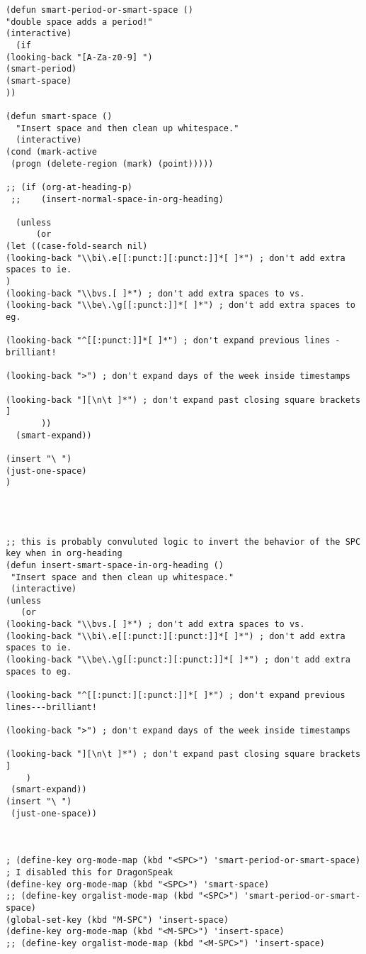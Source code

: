 \documentclass[11pt]{article}
\begin{document}
\begin{verbatim}
(defun smart-period-or-smart-space ()
"double space adds a period!"
(interactive)
  (if
(looking-back "[A-Za-z0-9] ")
(smart-period)
(smart-space)
))

(defun smart-space ()
  "Insert space and then clean up whitespace."
  (interactive)
(cond (mark-active
 (progn (delete-region (mark) (point)))))

;; (if (org-at-heading-p)
 ;;    (insert-normal-space-in-org-heading)

  (unless
      (or
(let ((case-fold-search nil)
(looking-back "\\bi\.e[[:punct:][:punct:]]*[ ]*") ; don't add extra spaces to ie.
)
(looking-back "\\bvs.[ ]*") ; don't add extra spaces to vs.
(looking-back "\\be\.\g[[:punct:]]*[ ]*") ; don't add extra spaces to eg.

(looking-back "^[[:punct:]]*[ ]*") ; don't expand previous lines - brilliant!

(looking-back ">") ; don't expand days of the week inside timestamps

(looking-back "][\n\t ]*") ; don't expand past closing square brackets ]
       ))
  (smart-expand))

(insert "\ ")
(just-one-space)
)




;; this is probably convuluted logic to invert the behavior of the SPC key when in org-heading
(defun insert-smart-space-in-org-heading ()
 "Insert space and then clean up whitespace."
 (interactive)
(unless
   (or
(looking-back "\\bvs.[ ]*") ; don't add extra spaces to vs.
(looking-back "\\bi\.e[[:punct:][:punct:]]*[ ]*") ; don't add extra spaces to ie.
(looking-back "\\be\.\g[[:punct:][:punct:]]*[ ]*") ; don't add extra spaces to eg.

(looking-back "^[[:punct:][:punct:]]*[ ]*") ; don't expand previous lines---brilliant!

(looking-back ">") ; don't expand days of the week inside timestamps

(looking-back "][\n\t ]*") ; don't expand past closing square brackets ]
    )
 (smart-expand))
(insert "\ ")
 (just-one-space))



; (define-key org-mode-map (kbd "<SPC>") 'smart-period-or-smart-space) ; I disabled this for DragonSpeak 
(define-key org-mode-map (kbd "<SPC>") 'smart-space)
;; (define-key orgalist-mode-map (kbd "<SPC>") 'smart-period-or-smart-space)
(global-set-key (kbd "M-SPC") 'insert-space)
(define-key org-mode-map (kbd "<M-SPC>") 'insert-space)
;; (define-key orgalist-mode-map (kbd "<M-SPC>") 'insert-space)


\end{verbatim}
\end{document}
